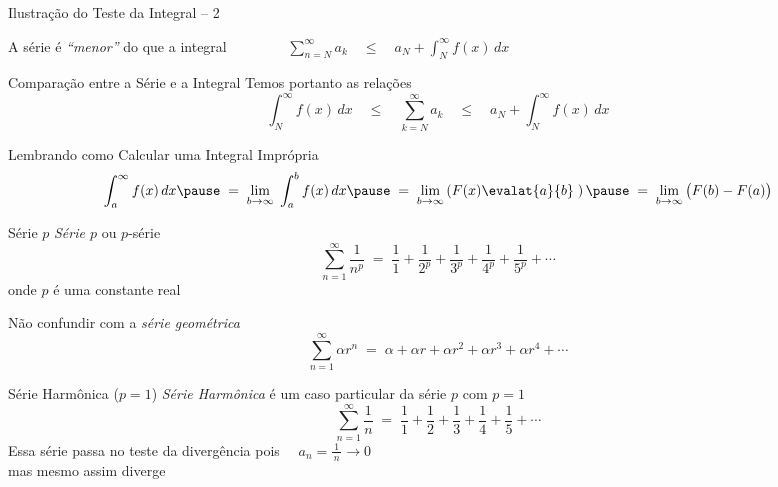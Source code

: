 \begin{frame}{Ilustração do Teste da Integral -- 2}
  \begin{center}
    \scalebox{.9}{}
  \end{center}

  \pause
  A série é \emph{``menor''} do que a integral
  \pause
  \(
    \qquad\qquad
    \sum_{n=N}^\infty a_k
    \quad\leq\quad
    a_{N} + \int_{N}^\infty f(x)\,dx
  \)
\end{frame}

\begin{frame}{Comparação entre a Série e a Integral}
  Temos portanto as relações
  \[
    \int_{N}^{\infty} f(x)\,dx
    \quad\leq\quad
    \sum_{k=N}^{\infty} a_k
    \quad\leq\quad
    a_N + \int_{N}^{\infty} f(x)\,dx
  \]
\end{frame}

\begin{frame}{Lembrando como Calcular uma Integral Imprópria}
  \[
    \int_{a}^{\infty} f(x)\,dx
    \pause \;=\;
    \lim_{b\to\infty} \; \int_{a}^{b} f(x)\,dx
    \pause \;=\;
    \lim_{b\to\infty} \left( F(x) \evalat{a}{b} \; \right)
    \pause \;=\;
    \lim_{b\to\infty} \big( F(b) - F(a) \big)
  \]
\end{frame}

\begin{frame}{Série $p$}
  \emph{Série $p$} ou $p$-série
  \[ \sum_{n=1}^{\infty} \frac{1}{n^p} \;=\;
     \frac{1}{1} +
     \frac{1}{2^p} +
     \frac{1}{3^p} +
     \frac{1}{4^p} +
     \frac{1}{5^p} + \cdots
  \]
  onde $p$ é uma constante real

  \pause
  \vspace{\baselineskip}
  Não confundir com a \emph{série geométrica}
  \[
    \sum_{n=1}^{\infty} \alpha r^n
    \;=\; \alpha + \alpha r + \alpha r^2 + \alpha r^3 + \alpha r^4 + \cdots
  \]

\end{frame}

\begin{frame}{Série Harmônica ($p=1$)}
  \emph{Série Harmônica} é um caso particular da série $p$ com $p=1$
  \[ \sum_{n=1}^{\infty} \frac{1}{n} \;=\;
     \frac{1}{1} +
     \frac{1}{2} +
     \frac{1}{3} +
     \frac{1}{4} +
     \frac{1}{5} + \cdots
  \]
  \pause
  Essa série passa no teste da divergência pois \(\quad a_n = \frac{1}{\,n\,}\to 0\) \\[3mm]
  mas mesmo assim diverge
\end{frame}

